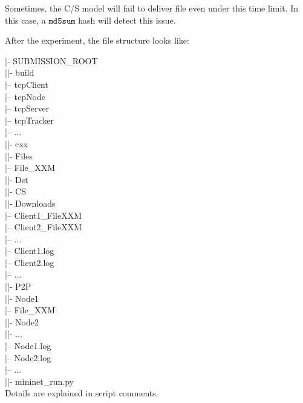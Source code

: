 Sometimes, the C/S model will fail to deliver file even under this time limit. In this case, a $\mathtt{md5sum}$ hash will detect this issue.

After the experiment, the file structure looks like:

    |- SUBMISSION\_ROOT \\
    |\quad|- build \\
    |\quad\quad-- tcpClient \\
    |\quad\quad-- tcpNode \\
    |\quad\quad-- tcpServer \\
    |\quad\quad-- tcpTracker \\
    |\quad\quad-- ... \\
    |\quad|- cxx \\
    |\quad|- Files \\
    |\quad\quad-- File\_XXM \\
    |\quad|- Dst \\
    |\quad\quad|- CS\\
    |\quad\quad\quad|- Downloads \\
    |\quad\quad\quad\quad-- Client1\_FileXXM\\
    |\quad\quad\quad\quad-- Client2\_FileXXM\\
    |\quad\quad\quad\quad-- ...\\
    |\quad\quad\quad-- Client1.log\\
    |\quad\quad\quad-- Client2.log\\
    |\quad\quad\quad-- ...\\
    |\quad\quad|- P2P\\
    |\quad\quad\quad|- Node1\\
    |\quad\quad\quad\quad-- File\_XXM\\
    |\quad\quad\quad|- Node2\\
    |\quad\quad\quad|- ...\\
    |\quad\quad\quad-- Node1.log\\
    |\quad\quad\quad-- Node2.log\\
    |\quad\quad\quad-- ...\\
    |\quad|- mininet\_run.py \\

    
Details are explained in script comments.
